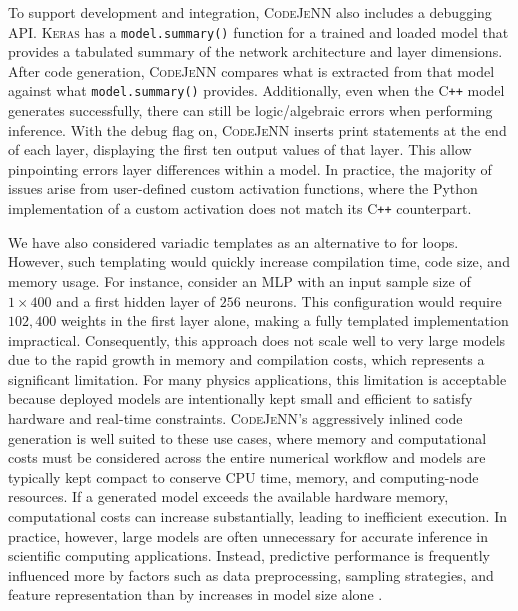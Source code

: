 \documentclass[preprint,12pt, a4paper]{elsarticle}
\begin{document}
To support development and integration, \textsc{CodeJeNN} also includes a debugging API. \textsc{Keras} has a \texttt{model.summary()} function for a trained and loaded model that provides a tabulated summary of the network architecture and layer dimensions. After code generation, \textsc{CodeJeNN} compares what is extracted from that model against what \texttt{model.summary()} provides. Additionally, even when the C\texttt{++} model generates successfully, there can still be logic/algebraic errors when performing inference. With the debug flag on, \textsc{CodeJeNN} inserts print statements at the end of each layer, displaying the first ten output values of that layer. This allow pinpointing errors layer differences within a model. In practice, the majority of issues arise from user-defined custom activation functions, where the Python implementation of a custom activation does not match its C\texttt{++} counterpart.

We have also considered variadic templates as an alternative to for loops. However, such templating would quickly increase compilation time, code size, and memory usage. For instance, consider an MLP with an input sample size of $1\times 400$ and a first hidden layer of $256$ neurons. This configuration would require $102{,}400$ weights in the first layer alone, making a fully templated implementation impractical. Consequently, this approach does not scale well to very large models due to the rapid growth in memory and compilation costs, which represents a significant limitation. For many physics applications, this limitation is acceptable because deployed models are intentionally kept small and efficient to satisfy hardware and real-time constraints. \textsc{CodeJeNN}’s aggressively inlined code generation is well suited to these use cases, where memory and computational costs must be considered across the entire numerical workflow and models are typically kept compact to conserve CPU time, memory, and computing-node resources. If a generated model exceeds the available hardware memory, computational costs can increase substantially, leading to inefficient execution. In practice, however, large models are often unnecessary for accurate inference in scientific computing applications. Instead, predictive performance is frequently influenced more by factors such as data preprocessing, sampling strategies, and feature representation than by increases in model size alone \cite{zhang_multi-scale_2022}.
\end{document}
